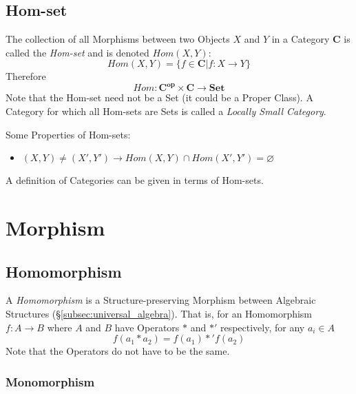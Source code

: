\subsection{Hom-set}\label{subsec:hom_set}

The collection of all Morphisms between two Objects $X$ and $Y$ in a
Category $\mathbf{C}$ is called the \emph{Hom-set} and is denoted
$Hom(X,Y)$:
\[
    Hom(X,Y) = \{f \in \mathbf{C} | f : X \rightarrow Y\}
\]
Therefore
\[
    Hom : \mathbf{C^{op}} \times \mathbf{C} \rightarrow \mathbf{Set}
\]
Note that the Hom-set need not be a Set (it could be a Proper Class).
A Category for which all Hom-sets are Sets is called a \emph{Locally
  Small Category}.



Some Properties of Hom-sets:
\begin{itemize}
\item $ (X,Y) \neq (X',Y') \rightarrow
  Hom(X,Y) \cap Hom(X',Y') = \varnothing$
\end{itemize}

A definition of Categories can be given in terms of Hom-sets. %



\section{Morphism}\label{sec:morphism}

\subsection{Homomorphism}\label{subsec:homomorphism}

A \emph{Homomorphism} is a Structure-preserving Morphism between
Algebraic Structures (\S\ref{subsec:universal_algebra}). That is, for
an Homomorphism $f : A \rightarrow B$ where $A$ and $B$ have Operators
$*$ and $*'$ respectively, for any $a_i \in A$
\[
    f(a_1 * a_2) = f(a_1) *' f(a_2)
\]
Note that the Operators do not have to be the same.



\subsubsection{Monomorphism}\label{subsec:monomorphism}

